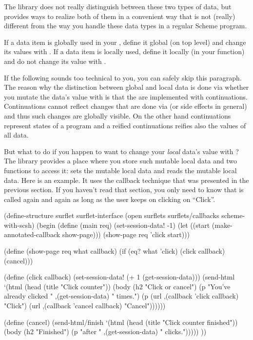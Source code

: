 The \surflet library does not really distinguish between these two
types of data, but provides ways to realize both of them in a
convenient way that is not (really) different from the way you handle
these data types in a regular Scheme program.

If a data item is globally used in your \surflet, define it global
(on top level) and change its values with .   If a data
item is locally used, define it locally (in your function) and do not
change its value with .  

If the following sounds too technical to you, you can safely skip this
paragraph.  The reason why the distinction between global and local
data is done via whether you mutate the data's value with 
is that the \surflets are implemented with continuations.
Continuations cannot reflect changes that are done via  (or
side effects in general) and thus such changes are globally visible.
On the other hand continuations represent states of a program and a
reified continuations reifies also the values of all data.

But what to do if you happen to want to change your \emph{local}
data's value with ?  The \surflet library provides a place
where you store such mutable local data and two functions to access
it:  sets the mutable local data and
 reads the mutable local data.  Here is an
example.  It uses the callback technique that was presented in the
previous section.  If you haven't read that section, you only need to
know that  is called again and again as long as the
user keeps on clicking on ``Click''.

\begin{listing}
(define-structure surflet surflet-interface
  (open surflets
        surflets/callbacks
        scheme-with-scsh)
  (begin
    (define (main req)
      (set-session-data! -1)
      (let ((start (make-annotated-callback show-page)))
        (show-page req 'click start)))

    (define (show-page req what callback)
      (if (eq? what 'click)
          (click callback)
          (cancel)))

    (define (click callback)
      (set-session-data! (+ 1 (get-session-data)))
      (send-html
       `(html 
         (head (title "Click counter"))
         (body
          (h2 "Click or cancel")
          (p "You've already clicked " 
             ,(get-session-data) 
             " times.")
          (p (url ,(callback 'click callback) "Click")
             (url ,(callback 'cancel callback) "Cancel"))))))

    (define (cancel)
      (send-html/finish
       `(html
         (head (title "Click counter finished"))
         (body
          (h2 "Finished")
          (p "after " ,(get-session-data) " clicks.")))))
))
\end{listing}


